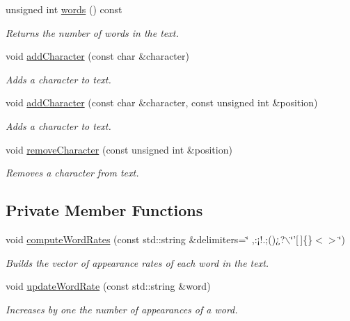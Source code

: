 \begin{CompactItemize}
unsigned int \hyperlink{class_text_edfd71af7802a2d72eed7365f081a66d}{words} () const 
\begin{CompactList}\small\item\em Returns the number of words in the text. \item\end{CompactList}\item 
void \hyperlink{class_text_6e6da63c90af68639adc7dd1336f6bf9}{addCharacter} (const char \&character)
\begin{CompactList}\small\item\em Adds a character to text. \item\end{CompactList}\item 
void \hyperlink{class_text_fdd11ad0c90ca483d4cff3d74a64da9e}{addCharacter} (const char \&character, const unsigned int \&position)
\begin{CompactList}\small\item\em Adds a character to text. \item\end{CompactList}\item 
void \hyperlink{class_text_e04500eeada2a4a3bb00554b32263c52}{removeCharacter} (const unsigned int \&position)
\begin{CompactList}\small\item\em Removes a character from text. \item\end{CompactList}\end{CompactItemize}
\subsection*{Private Member Functions}
\begin{CompactItemize}
\item 
void \hyperlink{class_text_e954a35628c72537e2ee5ca6e9609ac1}{computeWordRates} (const std::string \&delimiters=\char`\"{} ,:¡!.;()¿?$\backslash$\char`\"{}'\mbox{[}$\,$\mbox{]}\{\}$<$$>$\char`\"{})
\begin{CompactList}\small\item\em Builds the vector of appearance rates of each word in the text. \item\end{CompactList}\item 
void \hyperlink{class_text_5ab8f9bfa566de537a167991fe10eff5}{updateWordRate} (const std::string \&word)
\begin{CompactList}\small\item\em Increases by one the number of appearances of a word. \item\end{CompactList}\end{CompactItemize}
